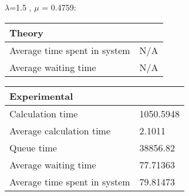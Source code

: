 \begin{minipage}{\linewidth}
   $\lambda$=1.5 , $\mu$ = 0.4759:

    \bigskip
    \begin{minipage}{0.45\linewidth}
        \begin{tabular}{|l|l|}
            \hline
            Theory & \\
            \hline
            Average time spent in system & N/A \\
            Average waiting time & N/A \\
            \hline
        \end{tabular}
    \end{minipage}
    \begin{minipage}{0.45\linewidth}
        \begin{tabular}{|l|l|}
            \hline
            Experimental & \\
            \hline
            Calculation time & 1050.5948 \\
            Average calculation time & 2.1011 \\
            Queue time & 38856.82 \\
            Average waiting time & 77.71363 \\
            Average time spent in system & 79.81473 \\
            \hline
        \end{tabular}
    \end{minipage}
    \bigskip
\end{minipage}
